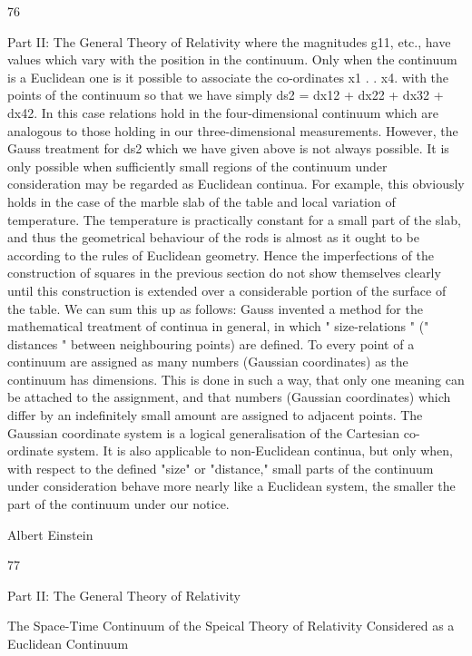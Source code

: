 \documentclass{article}
\begin{document}
76

Part II: The General Theory of Relativity
where the magnitudes g11, etc., have values which vary with the position in the continuum.
Only when the continuum is a Euclidean one is it possible to associate the co-ordinates x1 . .
x4. with the points of the continuum so that we have simply
ds2 = dx12 + dx22 + dx32 + dx42.
In this case relations hold in the four-dimensional continuum which are analogous to those
holding in our three-dimensional measurements.
However, the Gauss treatment for ds2 which we have given above is not always possible.
It is only possible when sufficiently small regions of the continuum under consideration
may be regarded as Euclidean continua. For example, this obviously holds in the case of the
marble slab of the table and local variation of temperature. The temperature is practically
constant for a small part of the slab, and thus the geometrical behaviour of the rods is
almost as it ought to be according to the rules of Euclidean geometry. Hence the
imperfections of the construction of squares in the previous section do not show themselves
clearly until this construction is extended over a considerable portion of the surface of the
table.
We can sum this up as follows: Gauss invented a method for the mathematical treatment
of continua in general, in which " size-relations " (" distances " between neighbouring
points) are defined. To every point of a continuum are assigned as many numbers (Gaussian
coordinates) as the continuum has dimensions. This is done in such a way, that only one
meaning can be attached to the assignment, and that numbers (Gaussian coordinates) which
differ by an indefinitely small amount are assigned to adjacent points. The Gaussian
coordinate system is a logical generalisation of the Cartesian co-ordinate system. It is also
applicable to non-Euclidean continua, but only when, with respect to the defined "size" or
"distance," small parts of the continuum under consideration behave more nearly like a
Euclidean system, the smaller the part of the continuum under our notice.

Albert Einstein

77

Part II: The General Theory of Relativity

The Space-Time Continuum of the
Speical Theory of Relativity
Considered as a Euclidean
Continuum
\end{document}
